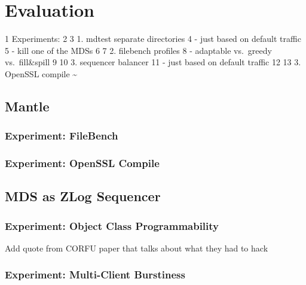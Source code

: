 \documentclass[10pt,twocolumn]{article}
\begin{document}
\section{Evaluation}\label{evaluation}

1 Experiments: 2 3 1. mdtest separate directories 4 - just based on
default traffic 5 - kill one of the MDSs 6 7 2. filebench profiles 8 -
adaptable vs.~greedy vs.~fill\&spill 9 10 3. sequencer balancer 11 -
just based on default traffic 12 13 3. OpenSSL compile
\textasciitilde{}\\\label{evaluation}

\subsection{Mantle}\label{mantle}

\subsubsection{Experiment: FileBench}\label{experiment-filebench}

\subsubsection{Experiment: OpenSSL
Compile}\label{experiment-openssl-compile}

\subsection{MDS as ZLog Sequencer}\label{mds-as-zlog-sequencer}

\subsubsection{Experiment: Object Class
Programmability}\label{experiment-object-class-programmability}

Add quote from CORFU paper that talks about what they had to hack

\subsubsection{Experiment: Multi-Client
Burstiness}\label{experiment-multi-client-burstiness}
\end{document}
